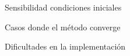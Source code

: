 \begin{frame}{Sensibilidad condiciones iniciales}
    
\end{frame}

\begin{frame}{Casos donde el método converge}
    
\end{frame}

\begin{frame}{Dificultades en la implementación}
    
\end{frame}
